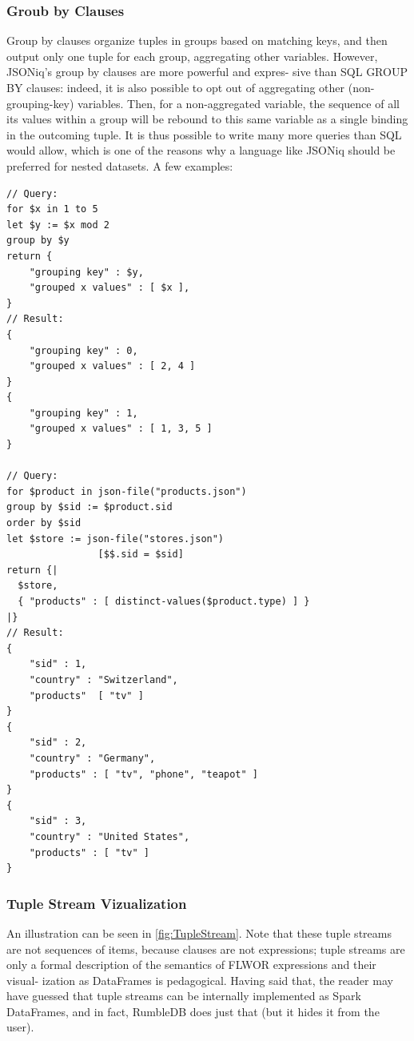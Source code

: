 \subsubsection{Groub by Clauses}
Group by clauses organize tuples in groups based on matching keys, and then output only one tuple for each group, aggregating other variables.
However, JSONiq's group by clauses are more powerful and expres- sive than SQL GROUP BY clauses: indeed, it is also possible to opt out of aggregating other (non-grouping-key) variables. Then, for a non-aggregated variable, the sequence of all its values within a group will be rebound to this same variable as a single binding in the outcoming tuple. It is thus possible to write many more queries than SQL would allow, which is one of the reasons why a language like JSONiq should be preferred for nested datasets.
A few examples:

\begin{lstlisting}[style=json]
// Query:
for $x in 1 to 5
let $y := $x mod 2
group by $y
return {
    "grouping key" : $y,
    "grouped x values" : [ $x ],
}
// Result:
{
    "grouping key" : 0,
    "grouped x values" : [ 2, 4 ]
}
{
    "grouping key" : 1,
    "grouped x values" : [ 1, 3, 5 ]
}

// Query:
for $product in json-file("products.json")
group by $sid := $product.sid
order by $sid
let $store := json-file("stores.json")
                [$$.sid = $sid]
return {|
  $store,
  { "products" : [ distinct-values($product.type) ] }
|}
// Result:
{
    "sid" : 1,
    "country" : "Switzerland",
    "products"  [ "tv" ]
}
{
    "sid" : 2,
    "country" : "Germany",
    "products" : [ "tv", "phone", "teapot" ]
}
{
    "sid" : 3,
    "country" : "United States",
    "products" : [ "tv" ]
}
\end{lstlisting}

\subsubsection{Tuple Stream Vizualization}

An illustration can be seen in \cref{fig:TupleStream}.
Note that these tuple streams are not sequences of items, because clauses are not expressions; tuple streams are only a formal description of the semantics of FLWOR expressions and their visual- ization as DataFrames is pedagogical. Having said that, the reader may have guessed that tuple streams can be internally implemented as Spark DataFrames, and in fact, RumbleDB does just that (but it hides it from the user).

